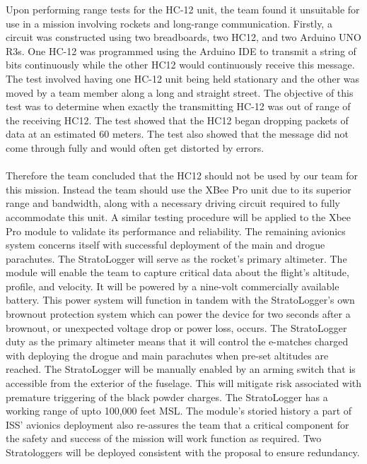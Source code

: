 Upon performing range tests for the HC-12 unit, the team found it unsuitable for use in a mission involving rockets and long-range communication. Firstly, a circuit was constructed using two breadboards, two HC12, and two Arduino UNO R3s. One HC-12 was programmed using the Arduino IDE to transmit a string of bits continuously while the other HC12 would continuously receive this message. The test involved having one HC-12 unit being held stationary and the other was moved by a team member along a long and straight street. The objective of this test was to determine when exactly the transmitting HC-12 was out of range of the receiving HC12. The test showed that the HC12 began dropping packets of data at an estimated 60 meters. The test also showed that the message did not come through fully and would often get distorted by errors.
\\\\
Therefore the team concluded that the HC12 should not be used by our team for this mission. Instead the team should use the XBee Pro unit due to its superior range and bandwidth, along with a necessary driving circuit required to fully accommodate this unit. A similar testing procedure will be applied to the Xbee Pro module to validate its performance and reliability.
The remaining avionics system concerns itself with successful deployment of the main and drogue parachutes. The StratoLogger will serve as the rocket’s primary altimeter. The module will enable the team to capture critical data about the flight’s altitude, profile, and velocity. It will be powered by a nine-volt commercially available battery. This power system will function in tandem with the StratoLogger’s own brownout protection system which can power the device for two seconds after a brownout, or unexpected voltage drop or power loss, occurs. The StratoLogger duty as the primary altimeter means that it will control the e-matches charged with deploying the drogue and main parachutes when pre-set altitudes are reached. The StratoLogger will be manually enabled by an arming switch that is accessible from the exterior of the fuselage. This will mitigate risk associated with premature triggering of the black powder charges. The StratoLogger has a working range of upto 100,000 feet MSL. The module’s storied history a part of ISS’ avionics deployment also re-assures the team that a critical component for the safety and success of the mission will work function as required. Two Stratologgers will be deployed consistent with the proposal to ensure redundancy. 
